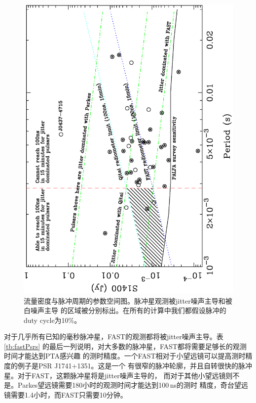 \begin{figure}
\begin{center}
\includegraphics[angle=-90,width=12cm]{fastPsrsSelect.ps}
\caption{流量密度与脉冲周期的参数空间图。脉冲星观测被jitter噪声主导和被白噪声主导
的区域被分别标出。在所有的计算中我们都假设脉冲的duty cycle为10\%。} \label{fg:fastPsrsSelect}
\end{center}
\end{figure}

对于几乎所有已知的毫秒脉冲星，FAST的观测都将被jitter噪声主导。表\ref{tb:fastPsrs}
的最后一列说明，对大多数的脉冲星，FAST都将需要足够长的观测时间才能达到PTA感兴趣
的测时精度。一个FAST相对于小望远镜可以提高测时精度的例子是PSR J1741$+$1351。这是一个
有很窄的脉冲轮廓，并且自转很快的脉冲星。对于FAST，这颗脉冲星将是jitter噪声主导的，
而对于其他小望远镜则不是。Parkes望远镜需要180小时的观测时间才能达到100\,ns的测时
精度，奇台望远镜需要1.4小时，而FAST只需要10分钟。

